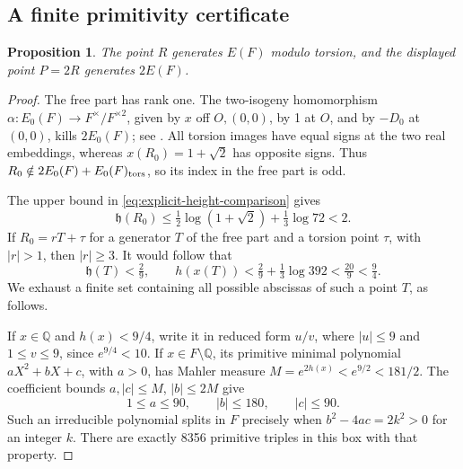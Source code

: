 \documentclass[11pt]{article}
\newtheorem{proposition}[theorem]{Proposition}
\theoremstyle{definition}
\newcommand{\Q}{\mathbb Q}\newcommand{\Z}{\mathbb Z}
\begin{document}
\subsection{A finite primitivity certificate}
\label{sec:saturation}

\begin{proposition}\label{prop:generator}
The point \(R\) generates \(E(F)\) modulo torsion, and the displayed
point \(P=2R\) generates \(2E(F)\).
\end{proposition}
\begin{proof}
The free part has rank one. The two-isogeny homomorphism
\(\alpha:E_0(F)\to F^\times/F^{\times2}\), given by
\(x\) off \(O,(0,0)\), by 1 at \(O\), and by \(-D_0\)
at \((0,0)\), kills \(2E_0(F)\); see \cite[Section 5]{H10}.
All torsion images have equal signs at the two real embeddings,
whereas \(x(R_0)=1+\sqrt2\) has opposite signs. Thus
\(R_0\notin2E_0(F)+E_0(F)_{\rm tors}\), so its index in the
free part is odd.

The upper bound in \eqref{eq:explicit-height-comparison} gives
\[
 \mathfrak h(R_0)
 \le\tfrac12\log(1+\sqrt2)+\tfrac13\log72<2.
\]
If \(R_0=rT+\tau\) for a generator \(T\) of the free part
and a torsion point \(\tau\), with \(|r|>1\), then \(|r|\ge3\).
It would follow that
\[
 \mathfrak h(T)<\tfrac29,\qquad
 h(x(T))<\tfrac29+\tfrac13\log392<\tfrac{20}9<\tfrac94.
\]
We exhaust a finite set containing all possible abscissas of such a
point \(T\), as follows.

If \(x\in\Q\) and \(h(x)<9/4\), write it in reduced form
\(u/v\), where \(|u|\le9\) and \(1\le v\le9\), since
\(e^{9/4}<10\). If \(x\in F\setminus\Q\), its primitive
minimal polynomial \(aX^2+bX+c\), with \(a>0\), has Mahler
measure \(M=e^{2h(x)}<e^{9/2}<181/2\). The coefficient bounds
\(a,|c|\le M\), \(|b|\le2M\) give
\begin{equation}\label{eq:search-box}
 1\le a\le90,\qquad |b|\le180,\qquad |c|\le90.
\end{equation}
Such an irreducible polynomial splits in \(F\) precisely when
\(b^2-4ac=2k^2>0\) for an integer \(k\). There are exactly
8356 primitive triples in this box with that property.


\end{proof}
\end{document}
